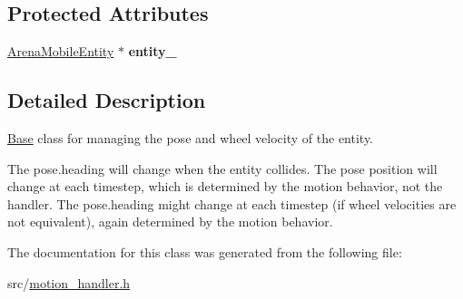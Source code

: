 \subsection*{Protected Attributes}
\begin{DoxyCompactItemize}
\item 
\hyperlink{classArenaMobileEntity}{Arena\+Mobile\+Entity} $\ast$ {\bfseries entity\+\_\+}\hypertarget{classMotionHandler_a659fd1ec8878260a63779bf45681f5a4}{}\label{classMotionHandler_a659fd1ec8878260a63779bf45681f5a4}

\end{DoxyCompactItemize}


\subsection{Detailed Description}
\hyperlink{classBase}{Base} class for managing the pose and wheel velocity of the entity. 

The pose.\+heading will change when the entity collides. The pose position will change at each timestep, which is determined by the motion behavior, not the handler. The pose.\+heading might change at each timestep (if wheel velocities are not equivalent), again determined by the motion behavior. 

The documentation for this class was generated from the following file\+:\begin{DoxyCompactItemize}
\item 
src/\hyperlink{motion__handler_8h}{motion\+\_\+handler.\+h}\end{DoxyCompactItemize}

